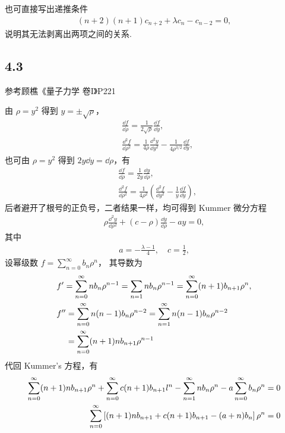 也可直接写出递推条件
\begin{align}
    (n+2) (n+1) c_{n+2} + \lambda c_n - c_{n-2} = 0,
\end{align}
说明其无法剥离出两项之间的关系.

\subsection{4.3}
参考顾樵《量子力学 卷I》P221

由 $\rho = y^2$ 得到 $y = \pm\sqrt\rho$，
\begin{align}
    &\frac{\dd f}{\dd\rho} = \frac{1}{2\sqrt\rho} \frac{\dd f}{\dd y}, \\
    &\frac{\dd^2f}{\dd\rho^2} = \frac1{4\rho} \frac{\dd^2y}{\dd y^2} - \frac{1}{4\rho^{3/2}} \frac{\dd f}{\dd y},
\end{align}
也可由 $\rho = y^2$ 得到 $2y\dd y = \dd\rho$，有
\begin{align}
    &\frac{\dd f}{\dd\rho} = \frac1{2y} \frac{\dd y}{\dd\rho}, \\
    &\frac{\dd^2 f}{\dd\rho^2} = \frac{1}{4\rho^2} \left(\frac{\dd^2 f}{\dd y^2} - \frac1y \frac{\dd f}{\dd y}\right),
\end{align}
后者避开了根号的正负号，二者结果一样，均可得到 Kummer 微分方程
\begin{align}
    \rho \frac{\dd^2y}{\dd\rho^2} + (c - \rho)\frac{\dd y}{\dd \rho} - a y = 0,
\end{align}
其中
\begin{align}
    a = - \frac{\lambda - 1}4, \quad c = \frac12,
\end{align}
设幂级数 $f = \sum_{n=0}^\infty b_n \rho^n$，
其导数为
\begin{align}
    &f' = \sum_{n=0}^\infty n b_n \rho^{n-1} = \sum_{n=1} n b_n \rho^{n-1} = \sum_{n=0}^\infty (n+1) b_{n+1} \rho^n, \\
    &f'' = \sum_{n=0}^\infty n(n-1) b_n \rho^{n-2} = \sum_{n=1}^\infty n(n-1) b_n \rho^{n-2} \notag \\
    &\phantom{f''} = \sum_{n=0}^\infty (n+1)n b_{n+1} \rho^{n-1}
\end{align}
代回 Kummer's 方程，有
\begin{align}
    \sum_{n=0}^{\infty}(n+1) n b_{n+1} \rho^n+\sum_{n=0}^{\infty} c(n+1) b_{n+1} l^n-\sum_{n=1}^{\infty} n b_n \rho^n-a \sum_{n=0}^{\infty} b_n \rho^n&=0 \notag \\
    \sum_{n=0}^{\infty}\left[(n+1) n b_{n+1}+c(n+1) b_{n+1}-(a+n) b_n\right] \rho^n&=0
\end{align}
